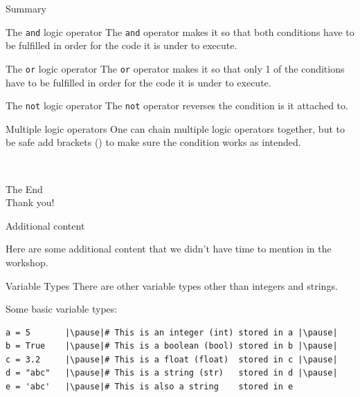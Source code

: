 \documentclass[dvipsnames, svgnames, x11names, handout]{beamer}
\begin{document}
\begin{frame}[fragile]{Summary}
\begin{block}{The \texttt{and} logic operator}
The \texttt{and} operator makes it so that both conditions have to be fulfilled in order for the code it is under to execute.
\end{block}
\begin{block}{The \texttt{or} logic operator}
The \texttt{or} operator makes it so that only 1 of the conditions have to be fulfilled in order for the code it is under to execute.
\end{block}
\begin{block}{The \texttt{not} logic operator}
The \texttt{not} operator reverses the condition is it attached to.
\end{block}
\begin{alertblock}{Multiple logic operators}
One can chain multiple logic operators together, but to be safe add brackets () to make sure the condition works as intended.
\end{alertblock}
\end{frame}

\begin{frame}{ \ }
	\begin{center}
		The End\\
		Thank you!
	\end{center}
\end{frame}






\setcounter{framenumber}{0}











\begin{frame}{Additional content}
	\begin{center}
		Here are some additional content that we didn't have time to mention in the workshop.
	\end{center}
\end{frame}

\begin{frame}[fragile]{Variable Types}
There are other variable types other than integers and strings.

Some basic variable types:
\begin{verbatim}
a = 5       |\pause|# This is an integer (int) stored in a |\pause|
b = True    |\pause|# This is a boolean (bool) stored in b |\pause|
c = 3.2     |\pause|# This is a float (float)  stored in c |\pause|
d = "abc"   |\pause|# This is a string (str)   stored in d |\pause|
e = 'abc'   |\pause|# This is also a string    stored in e
\end{verbatim}
\end{frame}
\end{document}
